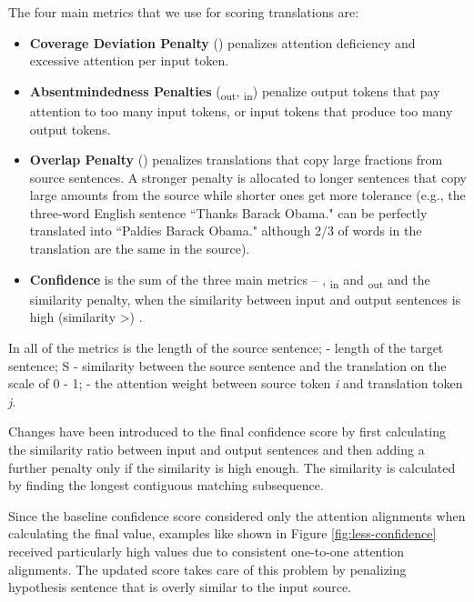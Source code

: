 \documentclass[runningheads,a4paper]{lncs/llncs}
\begin{document}
The four main metrics that we use for scoring translations are:
\begin{itemize}
  \item \textbf{Coverage Deviation Penalty} (\CDP) penalizes attention deficiency and excessive attention per input token.
  

  \item \textbf{Absentmindedness Penalties} (\AP\textsubscript{out}, \textsubscript{in}) penalize output tokens that pay attention to too many input tokens, or input tokens that produce too many output tokens.
  
  

  

  \item \textbf{Overlap Penalty} (\OP) penalizes translations that copy large fractions from source sentences. A stronger penalty is allocated to longer sentences that copy large amounts from the source while shorter ones get more tolerance (e.g., the three-word English sentence ``Thanks Barack Obama." can be perfectly translated into ``Paldies Barack Obama." although 2/3 of words in the translation are the same in the source). 




  



\item \textbf{Confidence} is the sum of the three main metrics -- \CDP{}, \AP{}\textsubscript{in} and \AP{}\textsubscript{out} and the similarity penalty, when the similarity between input and output sentences is high (similarity \textgreater {}) .
\end{itemize}
  

In all of the metrics  is the length of the source sentence;  - length of the target sentence; S - similarity between the source sentence and the translation on the scale of 0 - 1;  - the attention weight between source token \textit{i} and translation token \textit{j}.

Changes have been introduced to the final confidence score by first calculating the similarity ratio between input and output sentences and then adding a further penalty only if the similarity is high enough. The similarity is calculated by finding the longest contiguous matching subsequence.

Since the baseline confidence score considered only the attention alignments when calculating the final value, examples like shown in Figure \ref{fig:less-confidence} received particularly high values due to consistent one-to-one attention alignments. The updated score takes care of this problem by penalizing hypothesis sentence that is overly similar to the input source. 
\end{document}
